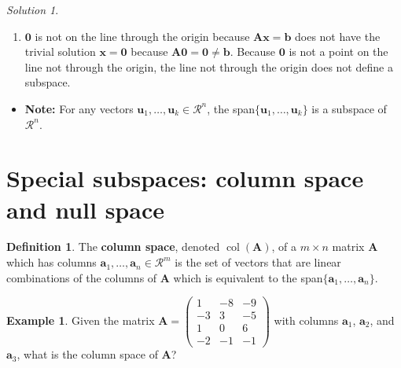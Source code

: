 \documentclass[
]{book}
\providecommand{\tightlist}{%
  \setlength{\itemsep}{0pt}\setlength{\parskip}{0pt}}
\theoremstyle{definition}
\newtheorem{definition}{Definition}[chapter]
\theoremstyle{definition}
\newtheorem{example}{Example}[chapter]
\theoremstyle{definition}
\theoremstyle{definition}
\theoremstyle{remark}
\newtheorem*{solution}{Solution}
\begin{document}
\begin{solution}
\begin{enumerate}
\def\labelenumi{\arabic{enumi})}
\tightlist
\item
  \(\mathbf{0}\) is not on the line through the origin because \(\mathbf{A} \mathbf{x} = \mathbf{b}\) does not have the trivial solution \(\mathbf{x} = \mathbf{0}\) because \(\mathbf{A} \mathbf{0} = \mathbf{0} \neq \mathbf{b}\). Because \(\mathbf{0}\) is not a point on the line not through the origin, the line not through the origin does not define a subspace.
\end{enumerate}

\end{solution}

\begin{itemize}
\tightlist
\item
  \textbf{Note:} For any vectors \(\mathbf{u}_1, \ldots, \mathbf{u}_k \in \mathcal{R}^n\), the span\(\{\mathbf{u}_1, \ldots, \mathbf{u}_k\}\) is a subspace of \(\mathcal{R}^n\).
\end{itemize}

\hypertarget{special-subspaces-column-space-and-null-space}{%
\section{Special subspaces: column space and null space}\label{special-subspaces-column-space-and-null-space}}

\begin{definition}
\protect\hypertarget{def:column-space}{}\label{def:column-space}The \textbf{column space}, denoted \(\operatorname{col}(\mathbf{A})\), of a \(m \times n\) matrix \(\mathbf{A}\) which has columns \(\mathbf{a}_1, \ldots, \mathbf{a}_n \in \mathcal{R}^m\) is the set of vectors that are linear combinations of the columns of \(\mathbf{A}\) which is equivalent to the span\(\{\mathbf{a}_1, \ldots, \mathbf{a}_n\}\).
\end{definition}

\begin{example}
Given the matrix \(\mathbf{A} = \begin{pmatrix} 1 & -8 & -9 \\ -3 & 3 & -5 \\ 1 & 0 & 6 \\ -2 & -1 & -1 \end{pmatrix}\) with columns \(\mathbf{a}_1\), \(\mathbf{a}_2\), and \(\mathbf{a}_3\), what is the column space of \(\mathbf{A}\)?
\end{example}
\end{document}
